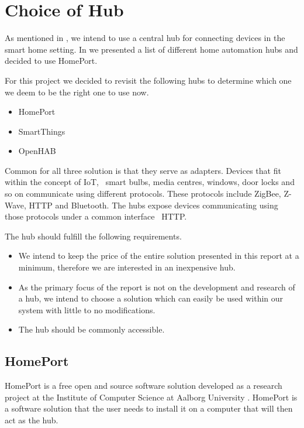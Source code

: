 \section{Choice of Hub}
\label{sec:analysis:choice-of-hub}

As mentioned in , we intend to use a central hub for connecting devices in the smart home setting. In \cite{prespecialisation} we presented a list of different home automation hubs and decided to use HomePort.

For this project we decided to revisit the following hubs to determine which one we deem to be the right one to use now.

\begin{itemize}
    \item HomePort
    \item SmartThings
    \item OpenHAB
\end{itemize}

Common for all three solution is that they serve as adapters. Devices that fit within the concept of IoT, \eg~smart bulbs, media centres, windows, door locks and so on communicate using different protocols. These protocols include ZigBee, Z-Wave, HTTP and Bluetooth. The hubs expose devices communicating using those protocols under a common interface \eg~HTTP.

The hub should fulfill the following requirements.

\begin{itemize}
\item We intend to keep the price of the entire solution presented in this report at a minimum, therefore we are interested in an inexpensive hub.
\item As the primary focus of the report is not on the development and research of a hub, we intend to choose a solution which can easily be used within our system with little to no modifications.
\item The hub should be commonly accessible.
\end{itemize}

\subsection{HomePort}
\label{sec:analysis:choice-of-hub:homeport}

HomePort is a free open and source software solution developed as a research project at the Institute of Computer Science at Aalborg University \cite{HOMEPORT10,homeport:github}.
HomePort is a software solution that the user needs to install it on a computer that will then act as the hub.

